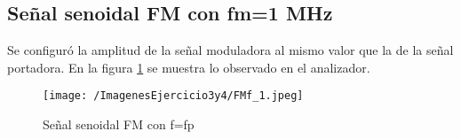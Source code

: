 \subsection{Señal senoidal FM con fm=1 MHz}

Se configuró la amplitud de la señal moduladora al mismo valor que la de la señal portadora. En la figura \ref{fig:fmf} se muestra lo observado en el analizador.

\begin{figure}[H]
	\centering
	\texttt{[image: /ImagenesEjercicio3y4/FMf\_1.jpeg]}
\caption{Señal senoidal FM con f=fp}
	\label{fig:fmf}
\end{figure}
